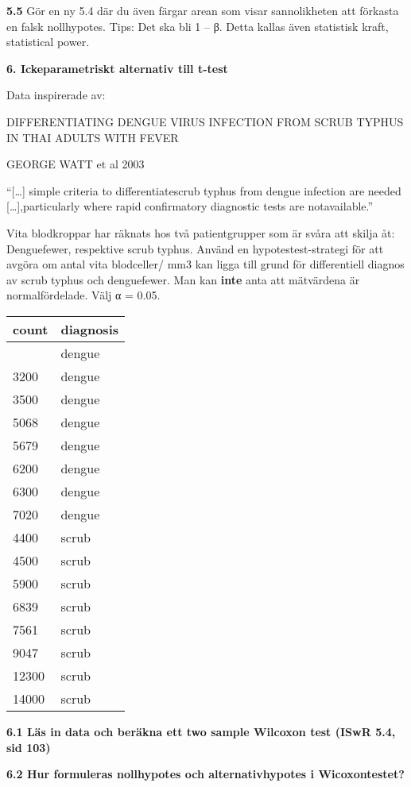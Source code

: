 \documentclass[
  letterpaper,
  DIV=11,
  numbers=noendperiod]{scrartcl}
\begin{document}
\textbf{5.5} Gör en ny 5.4 där du även färgar arean som visar
sannolikheten att förkasta en falsk nollhypotes. Tips: Det ska bli 1 --
β. Detta kallas även statistisk kraft, statistical power.

\textbf{6. Ickeparametriskt alternativ till t-test}

Data inspirerade av:

DIFFERENTIATING DENGUE VIRUS INFECTION FROM SCRUB TYPHUS IN THAI ADULTS
WITH FEVER

GEORGE WATT et al 2003

``{[}\ldots{]} simple criteria to differentiatescrub typhus from dengue
infection are needed {[}\ldots{]},particularly where rapid confirmatory
diagnostic tests are notavailable.''

Vita blodkroppar har räknats hos två patientgrupper som är svåra att
skilja åt: Denguefewer, respektive scrub typhus. Använd en
hypotestest-strategi för att avgöra om antal vita blodceller/ mm3 kan
ligga till grund för differentiell diagnos av scrub typhus och
denguefewer. Man kan \textbf{inte} anta att mätvärdena är
normalfördelade. Välj α = 0.05.

\begin{longtable}[]{@{}ll@{}}
\toprule\noalign{}
count & diagnosis \\
\midrule\noalign{}
\endhead
\bottomrule\noalign{}
\endlastfoot
3000 & dengue \\
3200 & dengue \\
3500 & dengue \\
5068 & dengue \\
5679 & dengue \\
6200 & dengue \\
6300 & dengue \\
7020 & dengue \\
4400 & scrub \\
4500 & scrub \\
5900 & scrub \\
6839 & scrub \\
7561 & scrub \\
9047 & scrub \\
12300 & scrub \\
14000 & scrub \\
\end{longtable}

\textbf{6.1 Läs in data och beräkna ett two sample Wilcoxon test (ISwR
5.4, sid 103)}

\textbf{6.2 Hur formuleras nollhypotes och alternativhypotes i
Wicoxontestet?}
\end{document}

